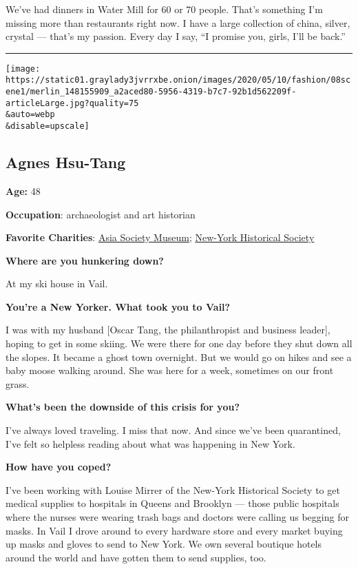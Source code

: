 We've had dinners in Water Mill for 60 or 70 people. That's something
I'm missing more than restaurants right now. I have a large collection
of china, silver, crystal --- that's my passion. Every day I say, ``I
promise you, girls, I'll be back.''

\begin{center}\rule{0.5\linewidth}{\linethickness}\end{center}

\texttt{[image: https://static01.graylady3jvrrxbe.onion/images/2020/05/10/fashion/08scene1/merlin\_148155909\_a2aced80-5956-4319-b7c7-92b1d562209f-articleLarge.jpg?quality=75\\\&auto=webp\\\&disable=upscale]}

\hypertarget{agnes-hsu-tang}{%
\subsection{Agnes Hsu-Tang}\label{agnes-hsu-tang}}

\textbf{Age:} 48

\textbf{Occupation}: archaeologist and art historian

\textbf{Favorite Charities}: \href{https://asiasociety.org/museum}{Asia
Society Museum}; \href{https://www.nyhistory.org}{New-York Historical
Society}

\textbf{Where are you hunkering down?}

At my ski house in Vail.

\textbf{You're a New Yorker. What took you to Vail?}

I was with my husband {[}Oscar Tang, the philanthropist and business
leader{]}, hoping to get in some skiing. We were there for one day
before they shut down all the slopes. It became a ghost town overnight.
But we would go on hikes and see a baby moose walking around. She was
here for a week, sometimes on our front grass.

\textbf{What's been the downside of this crisis for you?}

I've always loved traveling. I miss that now. And since we've been
quarantined, I've felt so helpless reading about what was happening in
New York.

\textbf{How have you coped?}

I've been working with Louise Mirrer of the New-York Historical Society
to get medical supplies to hospitals in Queens and Brooklyn --- those
public hospitals where the nurses were wearing trash bags and doctors
were calling us begging for masks. In Vail I drove around to every
hardware store and every market buying up masks and gloves to send to
New York. We own several boutique hotels around the world and have
gotten them to send supplies, too.

